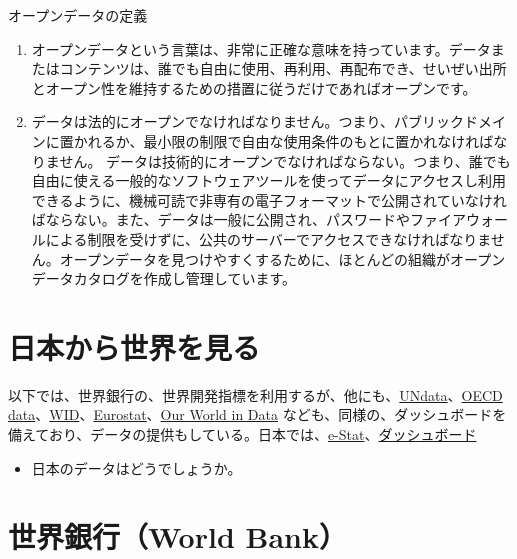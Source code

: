 \documentclass[
  xelatex, ja=standard]{bxjsbook}
\providecommand{\tightlist}{%
  \setlength{\itemsep}{0pt}\setlength{\parskip}{0pt}}
\theoremstyle{definition}
\theoremstyle{definition}
\theoremstyle{definition}
\theoremstyle{definition}
\theoremstyle{remark}
\begin{document}
オープンデータの定義

\begin{enumerate}
\def\labelenumi{\arabic{enumi}.}
\item
  オープンデータという言葉は、非常に正確な意味を持っています。データまたはコンテンツは、誰でも自由に使用、再利用、再配布でき、せいぜい出所とオープン性を維持するための措置に従うだけであればオープンです。
\item
  データは法的にオープンでなければなりません。つまり、パブリックドメインに置かれるか、最小限の制限で自由な使用条件のもとに置かれなければなりません。 データは技術的にオープンでなければならない。つまり、誰でも自由に使える一般的なソフトウェアツールを使ってデータにアクセスし利用できるように、機械可読で非専有の電子フォーマットで公開されていなければならない。また、データは一般に公開され、パスワードやファイアウォールによる制限を受けずに、公共のサーバーでアクセスできなければなりません。オープンデータを見つけやすくするために、ほとんどの組織がオープンデータカタログを作成し管理しています。
\end{enumerate}

\hypertarget{ux65e5ux672cux304bux3089ux4e16ux754cux3092ux898bux308b}{%
\section{日本から世界を見る}\label{ux65e5ux672cux304bux3089ux4e16ux754cux3092ux898bux308b}}

以下では、世界銀行の、世界開発指標を利用するが、他にも、\href{https://data.un.org}{UNdata}、\href{https://data.oecd.org}{OECD data}、\href{https://wid.world}{WID}、\href{https://ec.europa.eu/eurostat}{Eurostat}、\href{https://ourworldindata.org}{Our World in Data} なども、同様の、ダッシュボードを備えており、データの提供もしている。日本では、\href{https://www.e-stat.go.jp/}{e-Stat}、\href{https://dashboard.e-stat.go.jp}{ダッシュボード}

\begin{itemize}
\tightlist
\item
  日本のデータはどうでしょうか。
\end{itemize}

\hypertarget{ux4e16ux754cux9280ux884cworld-bank-1}{%
\section{世界銀行（World Bank）}\label{ux4e16ux754cux9280ux884cworld-bank-1}}
\end{document}
